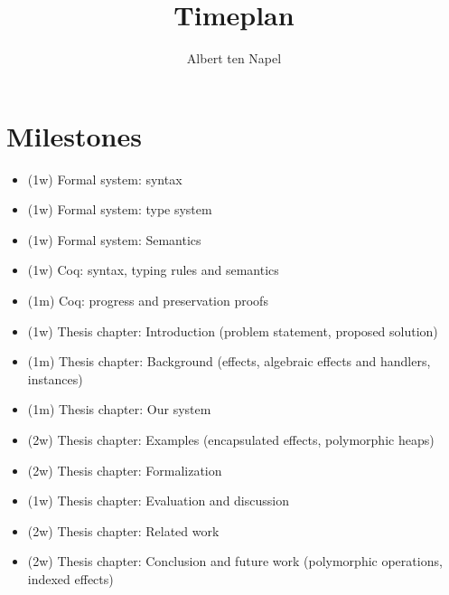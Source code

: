 \documentclass[12pt]{article}
\title{Timeplan}
\author{Albert ten Napel}
\date{}
\begin{document}
\maketitle

\section{Milestones}
\begin{itemize}
\item (1w) Formal system: syntax
\item (1w) Formal system: type system
\item (1w) Formal system: Semantics
\item (1w) Coq: syntax, typing rules and semantics
\item (1m) Coq: progress and preservation proofs
\item (1w) Thesis chapter: Introduction (problem statement, proposed solution)
\item (1m) Thesis chapter: Background (effects, algebraic effects and handlers, instances)
\item (1m) Thesis chapter: Our system
\item (2w) Thesis chapter: Examples (encapsulated effects, polymorphic heaps)
\item (2w) Thesis chapter: Formalization
\item (1w) Thesis chapter: Evaluation and discussion
\item (2w) Thesis chapter: Related work
\item (2w) Thesis chapter: Conclusion and future work (polymorphic operations, indexed effects)
\end{itemize}
\end{document}
